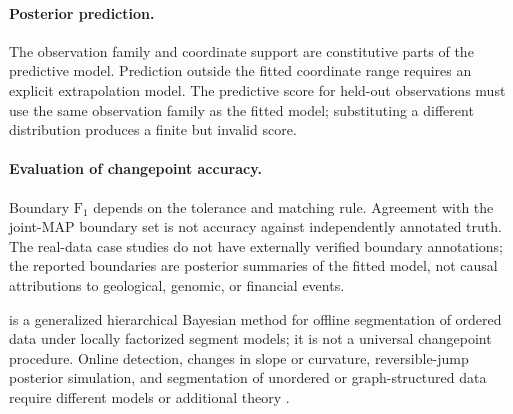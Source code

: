 \paragraph{Posterior prediction.}
The observation family and coordinate support are constitutive parts of the predictive model. Prediction outside the fitted coordinate range requires an explicit extrapolation model. The predictive score for held-out observations must use the same observation family as the fitted model; substituting a different distribution produces a finite but invalid score.

\paragraph{Evaluation of changepoint accuracy.}
Boundary $\mathrm{F_1}$ depends on the tolerance and matching rule. Agreement with the joint-MAP boundary set is not accuracy against independently annotated truth. The real-data case studies do not have externally verified boundary annotations; the reported boundaries are posterior summaries of the fitted model, not causal attributions to geological, genomic, or financial events.

\BayesBreak is a generalized hierarchical Bayesian method for offline segmentation of ordered data under locally factorized segment models; it is not a universal changepoint procedure. Online detection, changes in slope or curvature, reversible-jump posterior simulation, and segmentation of unordered or graph-structured data require different models or additional theory \citep{adamsmackay2007bocpd,ruggieri2014bcpvs,green1995rjMCMC,fearnhead2006exact}.
